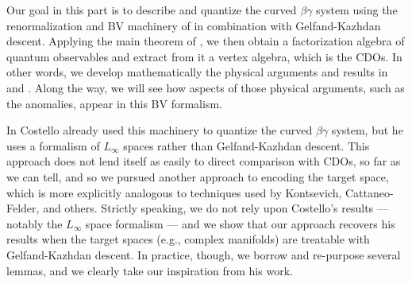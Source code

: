 Our goal in this part is to describe and quantize the curved $\beta\gamma$ system 
using the renormalization and BV machinery of \cite{CosBook} in combination with Gelfand-Kazhdan descent.
Applying the main theorem of \cite{CG}, we then obtain a factorization algebra of quantum observables 
and extract from it a vertex algebra, which is the CDOs.
In other words, we develop mathematically the physical arguments and results in \cite{WittenCDO} and \cite{Nek}.
Along the way, we will see how aspects of those physical arguments, such as the anomalies,
appear in this BV formalism.

\begin{rmk}
In \cite{WG1,WG2} Costello already used this machinery to quantize the curved $\beta\gamma$ system,
but he uses a formalism of $L_\infty$ spaces rather than Gelfand-Kazhdan descent.
This approach does not lend itself as easily to direct comparison with CDOs, so far as we can tell,
and so we pursued another approach to encoding the target space, 
which is more explicitly analogous to techniques used by Kontsevich, Cattaneo-Felder, and others.
Strictly speaking, we do not rely upon Costello's results --- notably the $L_\infty$ space formalism --- and we show that our approach recovers his results when the target spaces (e.g., complex manifolds) 
are treatable with Gelfand-Kazhdan descent.
In practice, though, we borrow and re-purpose several lemmas, and 
we clearly take our inspiration from his work.
\end{rmk}


